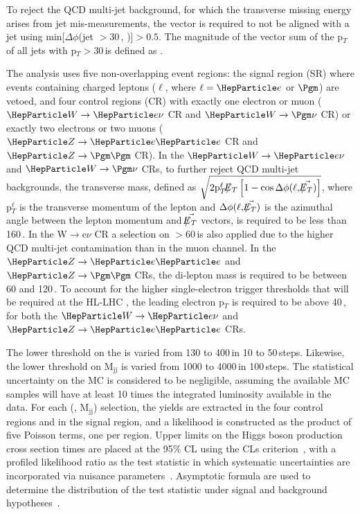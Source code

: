 \documentclass[../report.tex]{subfiles}
\begin{document}
To reject the QCD multi-jet background, for which the transverse
missing energy arises from jet mis-measurements, the \METvec vector is
required to not be aligned with a jet using min$[\Delta\phi$(jet
\ptvec$>30$\,\UGeV, \METvec)]$>0.5$. The magnitude of the vector sum of
the p$_{T}$ of all jets with p$_{T}>30$\,\UGeV is defined as \MHT.

The analysis uses five non-overlapping event regions: the signal
region (SR) where events containing charged leptons ($\ell$, where
$\ell=\Pe$ or $\Pgm$) are vetoed, and four control regions (CR) with
exactly one electron or muon ($\PW\rightarrow\Pe\nu$ CR and
$\PW\rightarrow\Pgm\nu$ CR) or exactly two electrons or two muons
($\PZ\rightarrow\Pe\Pe$ CR and $\PZ\rightarrow\Pgm\Pgm$ CR).  In the
$\PW\rightarrow\Pe\nu$ and $\PW\rightarrow\Pgm\nu$ CRs, to further
reject QCD multi-jet backgrounds, the transverse mass, defined as
$\sqrt{2\pt^{\ell}\MET\left[1
- \cos{\Delta\phi(\ell,\METvec)}\right]}$, where p$_{T}^{\ell}$ is the
transverse momentum of the lepton and $\Delta\phi(\ell,\METvec)$ is
the azimuthal angle between the lepton momentum and $\METvec$ vectors,
is required to be less than 160\,\UGeV. In the W$\rightarrow$e$\nu$ CR a
selection on \MET$>60$\,\UGeV is also applied due to the higher QCD
multi-jet contamination than in the muon channel. In the
$\PZ\rightarrow\Pe\Pe$ and $\PZ\rightarrow\Pgm\Pgm$ CRs, the di-lepton
mass is required to be between 60 and 120\,\UGeV. To account for the
higher single-electron trigger thresholds that will be required at the
HL-LHC , the leading electron p$_{T}$ is required to be above 40\,\UGeV,
for both the $\PW\rightarrow\Pe\nu$ and $\PZ\rightarrow\Pe\Pe$ CRs.

The lower threshold on the \MET is varied from 130 to 400\,\UGeV in 10 to
50\,\UGeV steps. Likewise, the lower threshold on M$_{\text{jj}}$ is
varied from 1000 to 4000\,\UGeV in 100\,\UGeV steps. The statistical
uncertainty on the MC is considered to be negligible, assuming the
available MC samples will have at least 10 times the integrated
luminosity available in the data.  For each (\MET, M$_{\text{jj}}$)
selection, the yields are extracted in the four control regions and in
the signal region, and a likelihood is constructed as the product of
five Poisson terms, one per region.  Upper limits on the Higgs boson
production cross section times
\BHinv are placed at the 95\% CL using the CLs
criterion~\cite{Read:2002hq,Junk:1999kv,Dittmaier:2012vm}, with a profiled
likelihood ratio as the test statistic in which systematic
uncertainties are incorporated via nuisance
parameters~\cite{Chatrchyan:2013lba,CMS-NOTE-2011-005}. Asymptotic
formula are used to determine the distribution of the test statistic
under signal and background hypotheses~\cite{Cowan:2010js}.
\end{document}
